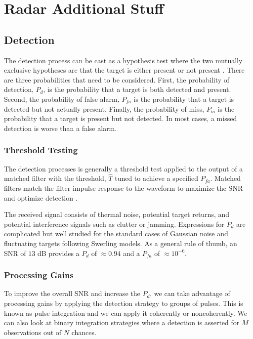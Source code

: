 \renewcommand{\baselinestretch}{2} \small\normalsize
\chapter{Radar Additional Stuff}

\section{Detection}
The detection process can be cast as a hypothesis test where the two mutually exclusive hypotheses are that the target is either present or not present \cite{richards_radar}. There are three probabilities that need to be considered. First, the probability of detection, $P_d$, is the probability that a target is both detected and present. Second, the probability of false alarm, $P_{fa}$ is the probability that a target is detected but not actually present. Finally, the probability of miss, $P_m$ is the probability that a target is present but not detected. In most cases, a missed detection is worse than a false alarm.

\subsection{Threshold Testing}
The detection processes is generally a threshold test applied to the output of a matched filter with the threshold, $\hat{T}$ tuned to achieve a specified $P_{fa}$. Matched filters match the filter impulse response to the waveform to maximize the SNR and optimize detection \cite{richards_dsp}. 

The received signal consists of thermal noise, potential target returns, and potential interference signals such as clutter or jamming. Expressions for $P_d$ are complicated but well studied for the standard cases of Gaussian noise and fluctuating targets following Swerling models. As a general rule of thumb, an SNR of $13$ dB provides a $P_d$ of $\approx 0.94$ and a $P_{fa}$ of $\approx 10^{-6}$.

\subsection{Processing Gains}
To improve the overall SNR and increase the $P_d$, we can take advantage of processing gains by applying the detection strategy to groups of pulses. This is known as pulse integration and we can apply it coherently or noncoherently. We can also look at binary integration strategies where a detection is asserted for $M$ observations out of $N$ chances.

